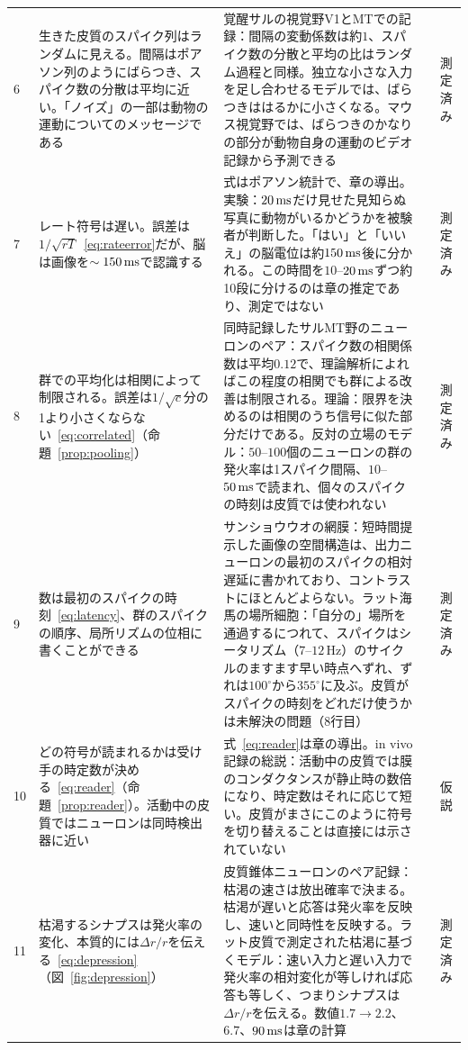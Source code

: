 {\begin{longtable}{>{\raggedright}p{0.5cm}>{\raggedright}p{4.0cm}>{\raggedright}p{5.6cm}>{\raggedright}p{2.3cm}>{\raggedright\arraybackslash}p{1.7cm}}
6 & 生きた皮質のスパイク列はランダムに見える。間隔はポアソン列のようにばらつき、スパイク数の分散は平均に近い。「ノイズ」の一部は動物の運動についてのメッセージである & 覚醒サルの視覚野V1とMTでの記録：間隔の変動係数は約$1$、スパイク数の分散と平均の比はランダム過程と同様。独立な小さな入力を足し合わせるモデルでは、ばらつきははるかに小さくなる。マウス視覚野では、ばらつきのかなりの部分が動物自身の運動のビデオ記録から予測できる & \cite{Softky1993,Stringer2019} & 測定済み \\
7 & レート符号は遅い。誤差は$1/\sqrt{rT}$~\eqref{eq:rateerror}だが、脳は画像を$\sim150\,\text{ms}$で認識する & 式はポアソン統計で、章の導出。実験：$20\,\text{ms}$だけ見せた見知らぬ写真に動物がいるかどうかを被験者が判断した。「はい」と「いいえ」の脳電位は約$150\,\text{ms}$後に分かれる。この時間を$10$--$20\,\text{ms}$ずつ約10段に分けるのは章の推定であり、測定ではない & \cite{Thorpe1996} & 測定済み \\
8 & 群での平均化は相関によって制限される。誤差は$1/\sqrt c$分の1より小さくならない~\eqref{eq:correlated}（命題~\ref{prop:pooling}） & 同時記録したサルMT野のニューロンのペア：スパイク数の相関係数は平均$0.12$で、理論解析によればこの程度の相関でも群による改善は制限される。理論：限界を決めるのは相関のうち信号に似た部分だけである。反対の立場のモデル：$50$--$100$個のニューロンの群の発火率は1スパイク間隔、$10$--$50\,\text{ms}$で読まれ、個々のスパイクの時刻は皮質では使われない & \cite{Zohary1994,MorenoBote2014,ShadlenNewsome1998} & 測定済み \\
9 & 数は最初のスパイクの時刻~\eqref{eq:latency}、群のスパイクの順序、局所リズムの位相に書くことができる & サンショウウオの網膜：短時間提示した画像の空間構造は、出力ニューロンの最初のスパイクの相対遅延に書かれており、コントラストにほとんどよらない。ラット海馬の場所細胞：「自分の」場所を通過するにつれて、スパイクはシータリズム（$7$--$12$\,Hz）のサイクルのますます早い時点へずれ、ずれは$100^\circ$から$355^\circ$に及ぶ。皮質がスパイクの時刻をどれだけ使うかは未解決の問題（8行目） & \cite{Gollisch2008,OKeefe1993} & 測定済み \\
10 & どの符号が読まれるかは受け手の時定数が決める~\eqref{eq:reader}（命題~\ref{prop:reader}）。活動中の皮質ではニューロンは同時検出器に近い & 式~\eqref{eq:reader}は章の導出。in vivo記録の総説：活動中の皮質では膜のコンダクタンスが静止時の数倍になり、時定数はそれに応じて短い。皮質がまさにこのように符号を切り替えることは直接には示されていない & \cite{Destexhe2003} & 仮説 \\
11 & 枯渇するシナプスは発火率の変化、本質的には$\Delta r/r$を伝える~\eqref{eq:depression}（図~\ref{fig:depression}） & 皮質錐体ニューロンのペア記録：枯渇の速さは放出確率で決まる。枯渇が遅いと応答は発火率を反映し、速いと同時性を反映する。ラット皮質で測定された枯渇に基づくモデル：速い入力と遅い入力で発火率の相対変化が等しければ応答も等しく、つまりシナプスは$\Delta r/r$を伝える。数値$1.7\to2.2$、$6.7$、$90\,\text{ms}$は章の計算 & \cite{Tsodyks1997,Abbott1997depression} & 測定済み \\

\end{longtable}}
